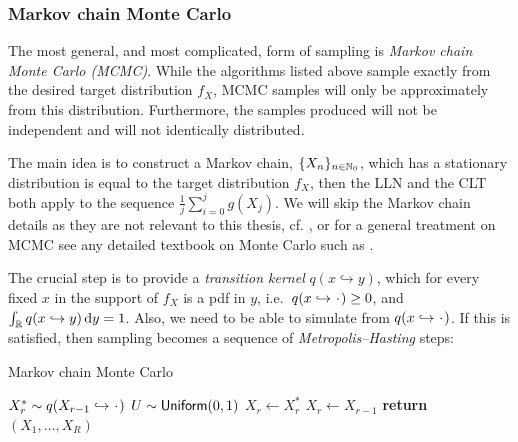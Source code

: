 

\subsubsection{Markov chain Monte Carlo}

The most general, and most complicated, form of sampling is \emph{Markov chain Monte Carlo (MCMC)}. While the algorithms listed above sample exactly from the desired target distribution $f_X$, MCMC samples will only be approximately from this distribution. Furthermore, the samples produced will not be independent and will not identically distributed.

The main idea is to construct a Markov chain, $\{ X_n \}_{n\in\mathbb{N}_0}$, which has a stationary distribution is equal to the target distribution $f_X$, then the LLN and the CLT both apply to the sequence $\frac1j\sum_{i=0}^j g(X_j)$. We will skip the Markov chain details as they are not relevant to this thesis, cf. \cite{meyn2012markov}, or for a general treatment on MCMC see any detailed textbook on Monte Carlo such as \cite{asmussen2007stochastic,glasserman2003monte,kroese2013handbook}.

The crucial step is to provide a \emph{transition kernel} $q(x \hookrightarrow y)$, which for every fixed $x$ in the support of $f_X$ is a pdf in $y$, i.e.\ $q(x \hookrightarrow \argdot) \ge 0$, and $\int_{\mathbb{R}} q(x \hookrightarrow y) \mathop{}\!\mathrm{d} y = 1$. Also, we need to be able to simulate from $q(x \hookrightarrow \argdot)$. If this is satisfied, then sampling becomes a sequence of \emph{Metropolis--Hasting} steps:

\begin{algorithm}
\caption{Markov chain Monte Carlo}
\label{alg:mcmc}
\begin{algorithmic}[1]
\State $X_r^\ast \sim q(X_{r-1} \hookrightarrow \argdot)$
\State $U \sim \mathsf{Uniform}(0,1)$
\State $X_r \gets X_r^\ast$
\Else
\State $X_r \gets X_{r-1}$
\EndIf
\EndFor
\State \textbf{return} $(X_1, \dots, X_R)$
\EndFunction
\end{algorithmic}
\end{algorithm}


